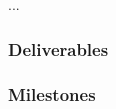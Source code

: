 ...


\gantttaskchart[draft,xscale=.33,yscale=.33,milestones]

\ifgrantagreement\else
\newpage
\subsubsection{Deliverables}\label{sec:deliverables}
\fi

\newpage
\subsubsection{Milestones}\label{sec:milestones}






